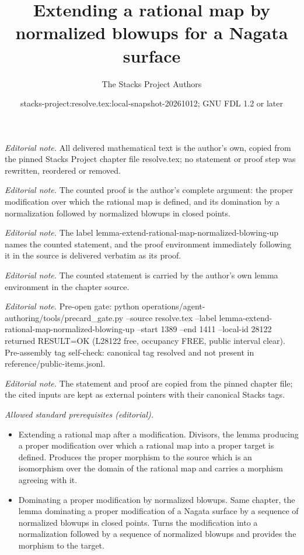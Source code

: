 \documentclass[10pt,a4paper]{amsart}
\title{Extending a rational map by normalized blowups for a Nagata surface}
\author{The Stacks Project Authors}
\date{stacks-project:resolve.tex:local-snapshot-20261012; GNU FDL 1.2 or later}
\theoremstyle{plain}
\theoremstyle{definition}
\theoremstyle{remark}
\numberwithin{equation}{subsection}
\begin{document}
\maketitle
\noindent\textit{Editorial note.} All delivered mathematical text is the author's own, copied from the pinned Stacks Project chapter file resolve.tex; no statement or proof step was rewritten, reordered or removed.\par\medskip
\noindent\textit{Editorial note.} The counted proof is the author's complete argument: the proper modification over which the rational map is defined, and its domination by a normalization followed by normalized blowups in closed points.\par\medskip
\noindent\textit{Editorial note.} The label lemma-extend-rational-map-normalized-blowing-up names the counted statement, and the proof environment immediately following it in the source is delivered verbatim as its proof.\par\medskip
\noindent\textit{Editorial note.} The counted statement is carried by the author's own lemma environment in the chapter source.\par\medskip
\noindent\textit{Editorial note.} Pre-open gate: python operations/agent-authoring/tools/precard\_gate.py --source resolve.tex --label lemma-extend-rational-map-normalized-blowing-up --start 1389 --end 1411 --local-id 28122 returned RESULT=OK (L28122 free, occupancy FREE, public interval clear). Pre-assembly tag self-check: canonical tag resolved and not present in reference/public-items.jsonl.\par\medskip
\noindent\textit{Editorial note.} The statement and proof are copied from the pinned chapter file; the cited inputs are kept as external pointers with their canonical Stacks tags.\par\medskip
\noindent\textit{Allowed standard prerequisites (editorial).}\begin{itemize}
\item Extending a rational map after a modification. Divisors, the lemma producing a proper modification over which a rational map into a proper target is defined. Produces the proper morphism to the source which is an isomorphism over the domain of the rational map and carries a morphism agreeing with it.
\item Dominating a proper modification by normalized blowups. Same chapter, the lemma dominating a proper modification of a Nagata surface by a sequence of normalized blowups in closed points. Turns the modification into a normalization followed by a sequence of normalized blowups and provides the morphism to the target.
\end{itemize}\medskip
\end{document}

